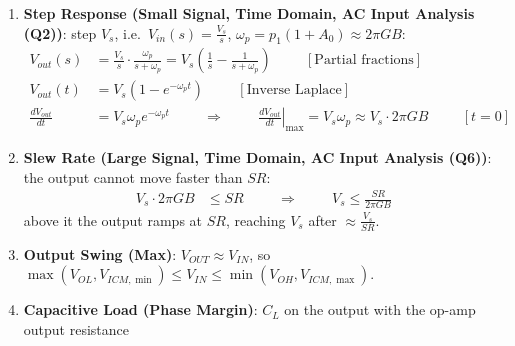 \begin{enumerate}
    \paragraph{At Output:} \(V_{in} = 0\), test voltage \(V_{test}\) at the output,
    \(V_- = V_{test}\), internal source \(A(0 - V_{test})\) behind \(R_o\):
    \begin{align*}
      I_{test} &= \frac{V_{test} - (-A V_{test})}{R_o} = \frac{V_{test}(1 + A)}{R_o} \hspace{1cm} \Rightarrow \hspace{1cm} Z_{out} = \frac{R_o}{1 + A}
    \end{align*}
  \item \textbf{Step Response (Small Signal, Time Domain, AC Input Analysis (Q2))}: step
    \(V_s\), i.e.\ \(V_{in}(s) = \frac{V_s}{s}\), \(\omega_p = p_1(1 + A_0) \approx 2\pi GB\):
    \begin{align*}
      V_{out}(s) &= \frac{V_s}{s}\cdot\frac{\omega_p}{s + \omega_p} = V_s\left(\frac{1}{s} - \frac{1}{s + \omega_p}\right) \hspace{1cm} [\text{Partial fractions}] \\
      V_{out}(t) &= V_s\left(1 - e^{-\omega_p t}\right) \hspace{1cm} [\text{Inverse Laplace}] \\
      \frac{dV_{out}}{dt} &= V_s \omega_p e^{-\omega_p t} \hspace{1cm} \Rightarrow \hspace{1cm} \left.\frac{dV_{out}}{dt}\right|_{\max} = V_s \omega_p \approx V_s \cdot 2\pi GB \hspace{1cm} [t = 0]
    \end{align*}
  \item \textbf{Slew Rate (Large Signal, Time Domain, AC Input Analysis (Q6))}: the output
    cannot move faster than \(SR\):
    \begin{align*}
      V_s \cdot 2\pi GB &\leq SR \hspace{1cm} \Rightarrow \hspace{1cm} V_s \leq \frac{SR}{2\pi GB}
    \end{align*}
    above it the output ramps at \(SR\), reaching \(V_s\) after \(\approx \frac{V_s}{SR}\).
  \item \textbf{Output Swing (Max)}: \(V_{OUT} \approx V_{IN}\), so
    \(\max(V_{OL}, V_{ICM,\min}) \leq V_{IN} \leq \min(V_{OH}, V_{ICM,\max})\).
  \item \textbf{Capacitive Load (Phase Margin)}: \(C_L\) on the output with the op-amp output resistance

\end{enumerate}
